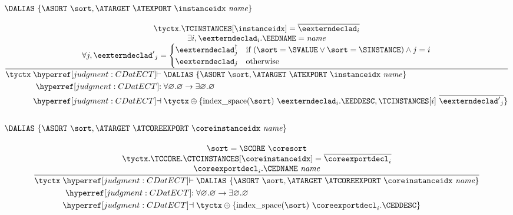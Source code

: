 \subsubsection{$\DALIAS~\{ \ASORT~\sort, \ATARGET~\ATEXPORT~\instanceidx~\name \}$}
\[
  \frac{
    \begin{array}{@{}c@{}}
    \tyctx.\TCINSTANCES[\instanceidx] = \overline{{\eexterndeclad}_i}\\
    \exists i, {\eexterndeclad}_i.\EEDNAME = \name\\
    \forall j, {\eexterndeclad'}_j = \begin{cases}
      {\eexterndeclad}_j^\dagger&\text{if } (\sort = \SVALUE \lor \sort = \SINSTANCE) \land j = i\\
      {\eexterndeclad}_j&\text{otherwise}\\
    \end{cases}\\
    \end{array}
  }{
   \begin{aligned}
    \tyctx \vdashh!CDatECT!{}& \DALIAS~\{ \ASORT~\sort, \ATARGET~\ATEXPORT~\instanceidx~\name \}\\
    \trelh!CDatECT!{}& \forall\varnothing.\varnothing \to \exists\varnothing.\varnothing\\
    \dashvh!CDatECT!{}& \tyctx \oplus \{ \F{index\_space}(\sort)~{\eexterndeclad}_i.\EEDDESC, \TCINSTANCES[i]~\overline{{\eexterndeclad'}_j} \}\\
    \end{aligned}
  }
\]

\subsubsection{$\DALIAS~\{ \ASORT~\sort, \ATARGET~\ATCOREEXPORT~\coreinstanceidx~\name \}$}
\[
  \frac{
    \begin{array}{@{}c@{}}
    \sort = \SCORE~\coresort\\
    \tyctx.\TCCORE.\CTCINSTANCES[\coreinstanceidx] = \overline{\coreexportdecl_i}\\
    {\coreexportdecl}_i.\CEDNAME~\name\\
    \end{array}
  }{
    \begin{aligned}
    \tyctx \vdashh!CDatECT!{}& \DALIAS~\{ \ASORT~\sort, \ATARGET~\ATCOREEXPORT~\coreinstanceidx~\name \}\\
    \trelh!CDatECT!{}& \forall\varnothing.\varnothing \to \exists\varnothing.\varnothing\\
    \dashvh!CDatECT!{}& \tyctx \oplus \{ \F{index\_space}(\sort)~{\coreexportdecl}_i.\CEDDESC \}
    \end{aligned}
  }
\]

